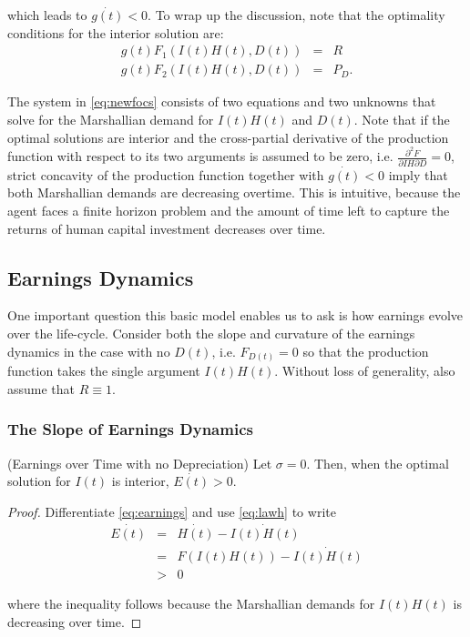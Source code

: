 \noindent which leads to $\dot{g(t)} < 0$. To wrap up the discussion, note that the optimality conditions for the interior solution are:
\begin{eqnarray}
g(t) F_{1}(I(t)H(t),D(t)) &=& R \nonumber \\
g(t) F_{2}(I(t)H(t),D(t)) &=& P_{D} \label{eq:newfocs}. 
\end{eqnarray}

\indent The system in \eqref{eq:newfocs} consists of two equations and two unknowns that solve for the Marshallian demand for $I(t)H(t)$ and $D(t)$. Note that if the optimal solutions are interior and the cross-partial derivative of the production function with respect to its two arguments is assumed to be zero, i.e. $\frac{\partial^2F}{\partial IH \partial D} = 0$, strict concavity of the production function together with $\dot{g(t)} < 0$ imply that both Marshallian demands are decreasing overtime. This is intuitive, because the agent faces a finite horizon problem and the amount of time left to capture the returns of human capital investment decreases over time. 

\subsection{Earnings Dynamics}
\indent One important question this basic model enables us to ask is how earnings evolve over the life-cycle. Consider both the slope and curvature of the earnings dynamics in the case with no $D(t)$, i.e. $F_{D(t)}=0$ so that the production function takes the single argument $I(t)H(t)$. Without loss of generality, also assume that $R\equiv1$.

\subsubsection{The Slope of Earnings Dynamics}

\begin{claim} (Earnings over Time with no Depreciation) \label{claim:earnnodep}
Let $\sigma = 0$. Then, when the optimal solution for $I(t)$ is interior, $\dot{E(t)} > 0$.
\end{claim}

\begin{proof}
Differentiate \eqref{eq:earnings} and use \eqref{eq:lawh} to write
\begin{eqnarray}
\dot{E(t)} &=& \dot{H(t)} - \dot{I(t)H(t)}  \nonumber \\
           &=& F \left( I(t) H(t) \right) - \dot{I(t)H(t)}  \nonumber \\     
           &>& 0 
\end{eqnarray}

\noindent where the inequality follows because the Marshallian demands for $I(t)H(t)$ is decreasing over time.
\end{proof}

